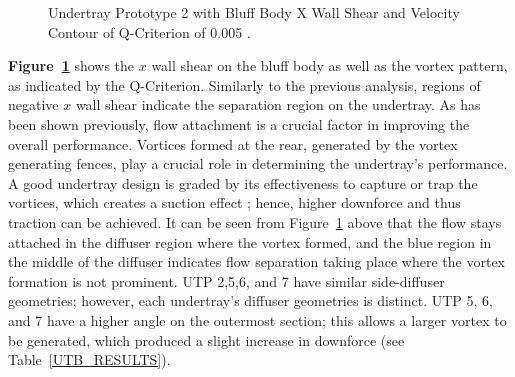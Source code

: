 \begin{figure}[!htb] 
    \centering
    \noindent{}
    \caption{Undertray Prototype 2 with Bluff Body X Wall Shear and Velocity Contour of Q-Criterion of 0.005 .}
      \label{fig:3D_QCRIT_WSHEAR_UTP2}
\end{figure}

\noindent \textbf{Figure~\ref{fig:3D_QCRIT_WSHEAR_UTP2}} shows the $x$ wall shear on the bluff body as well as the vortex pattern, as indicated by the Q-Criterion. Similarly to the previous analysis, regions of negative $x$ wall shear indicate the separation region on the undertray. As has been shown previously, flow attachment is a crucial factor in improving the overall performance. Vortices formed at the rear, generated by the vortex generating fences, play a crucial role in determining the undertray's performance. A good undertray design is graded by its effectiveness to capture or trap the vortices, which creates a suction effect \cite{Bouferrouk2014OnVehicles}; hence, higher downforce and thus traction can be achieved. It can be seen from Figure~\ref{fig:3D_QCRIT_WSHEAR_UTP2} above that the flow stays attached in the diffuser region where the vortex formed, and the blue region in the middle of the diffuser indicates flow separation taking place where the vortex formation is not prominent. UTP 2,5,6, and 7 have similar side-diffuser geometries; however, each undertray's diffuser geometries is distinct. UTP 5, 6, and 7 have a higher angle on the outermost section; this allows a larger vortex to be generated, which produced a slight increase in downforce (see Table~\ref{UTB_RESULTS}).

